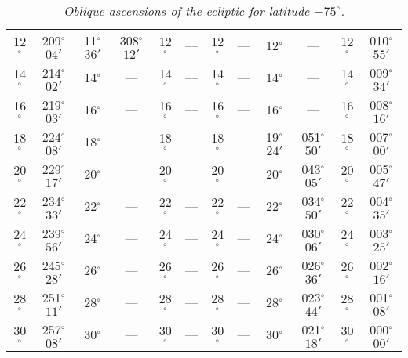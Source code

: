 \begin{table}
{\begin{tabular}{cc|cc|cc|cc|cc|cc}
12$^\circ$ & 209$^\circ$$04'$ & 11$^\circ$$36'$ & 308$^\circ$$12'$ & 12$^\circ$ & --- & 12$^\circ$ & --- &  12$^\circ$ & --- & 12$^\circ$ & 010$^\circ$$55'$\\
14$^\circ$ & 214$^\circ$$02'$ & 14$^\circ$ & --- & 14$^\circ$ & --- & 14$^\circ$ & --- &  14$^\circ$ & --- & 14$^\circ$ & 009$^\circ$$34'$\\
16$^\circ$ & 219$^\circ$$03'$ & 16$^\circ$ & --- & 16$^\circ$ & --- & 16$^\circ$ & --- &  16$^\circ$ & --- & 16$^\circ$ & 008$^\circ$$16'$\\
18$^\circ$ & 224$^\circ$$08'$ & 18$^\circ$ & --- & 18$^\circ$ & --- & 18$^\circ$ & --- &  19$^\circ$$24'$ &051$^\circ$$50'$  & 18$^\circ$ & 007$^\circ$$00'$\\
20$^\circ$ & 229$^\circ$$17'$ & 20$^\circ$ & --- & 20$^\circ$ & --- & 20$^\circ$ & --- &  20$^\circ$ & 043$^\circ$$05'$ & 20$^\circ$ & 005$^\circ$$47'$\\
22$^\circ$ & 234$^\circ$$33'$ & 22$^\circ$ & --- & 22$^\circ$ & --- & 22$^\circ$ & --- &  22$^\circ$ & 034$^\circ$$50'$ & 22$^\circ$ & 004$^\circ$$35'$\\
24$^\circ$ & 239$^\circ$$56'$ & 24$^\circ$ & --- & 24$^\circ$ & --- & 24$^\circ$ & --- &  24$^\circ$ & 030$^\circ$$06'$ & 24$^\circ$ & 003$^\circ$$25'$\\
26$^\circ$ & 245$^\circ$$28'$ & 26$^\circ$ & --- & 26$^\circ$ & --- & 26$^\circ$ & --- &  26$^\circ$ & 026$^\circ$$36'$ & 26$^\circ$ & 002$^\circ$$16'$\\
28$^\circ$ & 251$^\circ$$11'$ & 28$^\circ$ & --- & 28$^\circ$ & --- & 28$^\circ$ & --- &  28$^\circ$ & 023$^\circ$$44'$ & 28$^\circ$ & 001$^\circ$$08'$\\
30$^\circ$ & 257$^\circ$$08'$ & 30$^\circ$ & --- & 30$^\circ$ & --- & 30$^\circ$ & --- &  30$^\circ$ & 021$^\circ$$18'$ & 30$^\circ$ & 000$^\circ$$00'$\\
\end{tabular}}
\caption{\em Oblique ascensions of the ecliptic  for latitude $+75^\circ$.}
\end{table}

